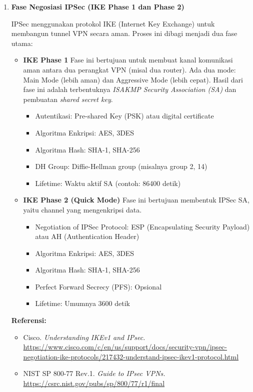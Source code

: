 \begin{enumerate}
\item \textbf{Fase Negosiasi IPSec (IKE Phase 1 dan Phase 2)}

IPSec menggunakan protokol IKE (Internet Key Exchange) untuk membangun tunnel VPN secara aman. Proses ini dibagi menjadi dua fase utama:

\begin{itemize}
	\item \textbf{IKE Phase 1}  
	Fase ini bertujuan untuk membuat kanal komunikasi aman antara dua perangkat VPN (misal dua router). Ada dua mode: Main Mode (lebih aman) dan Aggressive Mode (lebih cepat). Hasil dari fase ini adalah terbentuknya \textit{ISAKMP Security Association (SA)} dan pembuatan \textit{shared secret key}.
	\begin{itemize}
		\item Autentikasi: Pre-shared Key (PSK) atau digital certificate
		\item Algoritma Enkripsi: AES, 3DES
		\item Algoritma Hash: SHA-1, SHA-256
		\item DH Group: Diffie-Hellman group (misalnya group 2, 14)
		\item Lifetime: Waktu aktif SA (contoh: 86400 detik)
	\end{itemize}

	\item \textbf{IKE Phase 2 (Quick Mode)}  
	Fase ini bertujuan membentuk IPSec SA, yaitu channel yang mengenkripsi data.  
	\begin{itemize}
		\item Negotiation of IPSec Protocol: ESP (Encapsulating Security Payload) atau AH (Authentication Header)
		\item Algoritma Enkripsi: AES, 3DES
		\item Algoritma Hash: SHA-1, SHA-256
		\item Perfect Forward Secrecy (PFS): Opsional
		\item Lifetime: Umumnya 3600 detik
	\end{itemize}
\end{itemize}

\textbf{Referensi:}
\begin{itemize}
	\item Cisco. \textit{Understanding IKEv1 and IPsec.} \url{https://www.cisco.com/c/en/us/support/docs/security-vpn/ipsec-negotiation-ike-protocols/217432-understand-ipsec-ikev1-protocol.html}
	\item NIST SP 800-77 Rev.1. \textit{Guide to IPsec VPNs.} \url{https://csrc.nist.gov/pubs/sp/800/77/r1/final}
\end{itemize}


\end{enumerate}
